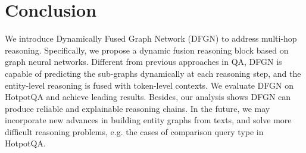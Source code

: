 \documentclass[11pt,a4paper]{article}
\newcommand{\hotpotqa}{HotpotQA\xspace}
\newcommand{\method}{DFGN\xspace}
\begin{document}
\section{Conclusion}
\label{sec:conclusion}
We introduce Dynamically Fused Graph Network (\method) to address multi-hop reasoning. Specifically, we propose a dynamic fusion reasoning block based on graph neural networks. Different from previous approaches in QA, \method is capable of predicting the sub-graphs dynamically at each reasoning step, and the entity-level reasoning is fused with token-level contexts. We evaluate \method on \hotpotqa and achieve leading results. Besides, our analysis shows \method can produce reliable and explainable reasoning chains. In the future, we may incorporate new advances in building entity graphs from texts, and solve more difficult reasoning problems, e.g. the cases of comparison query type in \hotpotqa. 


\end{document}
